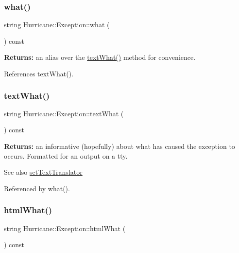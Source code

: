 \subsubsection{\texorpdfstring{what()}{what()}}
{\footnotesize\ttfamily string Hurricane\+::\+Exception\+::what (\begin{DoxyParamCaption}{ }\end{DoxyParamCaption}) const\hspace{0.3cm}{\ttfamily [inline]}}

{\bfseries Returns\+:} an alias over the \hyperlink{classHurricane_1_1Exception_a19b5d24e8f02bb99625a5206638c44e8}{text\+What()} method for convenience. 

References text\+What().

\mbox{\label{classHurricane_1_1Exception_a19b5d24e8f02bb99625a5206638c44e8}} 
\subsubsection{\texorpdfstring{text\+What()}{textWhat()}}
{\footnotesize\ttfamily string Hurricane\+::\+Exception\+::text\+What (\begin{DoxyParamCaption}{ }\end{DoxyParamCaption}) const\hspace{0.3cm}{\ttfamily [inline]}}

{\bfseries Returns\+:} an informative (hopefully) about what has caused the exception to occurs. Formatted for an output on a tty.

\begin{DoxySeeAlso}{See also}
\hyperlink{classHurricane_1_1Exception_a1a57fbbc4b57a014558ba31d18ec9b62}{set\+Text\+Translator} 
\end{DoxySeeAlso}


Referenced by what().

\mbox{\label{classHurricane_1_1Exception_a2582e6c3acb236e24f48cb873f64e3e9}} 
\subsubsection{\texorpdfstring{html\+What()}{htmlWhat()}}
{\footnotesize\ttfamily string Hurricane\+::\+Exception\+::html\+What (\begin{DoxyParamCaption}{ }\end{DoxyParamCaption}) const\hspace{0.3cm}{\ttfamily [inline]}}

